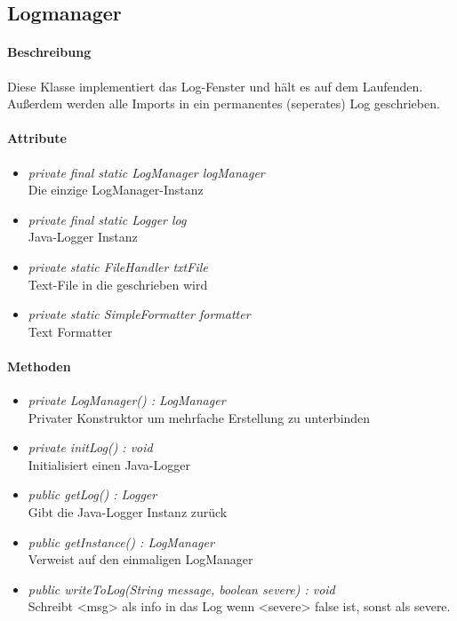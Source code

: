 \subsection{Logmanager}

\paragraph{Beschreibung}
Diese Klasse implementiert das Log-Fenster und hält es auf dem Laufenden.
Außerdem werden alle Imports in ein permanentes (seperates) Log geschrieben.


\paragraph{Attribute}

\begin{itemize}
	
\item \textit{private final static LogManager logManager}  
\\ Die einzige LogManager-Instanz 
\item \textit{private final static Logger log}
\\ Java-Logger Instanz
\item \textit{private static FileHandler txtFile}
\\ Text-File in die geschrieben wird
\item \textit{private static SimpleFormatter formatter}
\\ Text Formatter

\end{itemize}

\paragraph{Methoden}

\begin{itemize}
	
\item \textit{ private LogManager() : LogManager}  \\ Privater Konstruktor um mehrfache Erstellung zu unterbinden
\item \textit{ private initLog() : void} \\ Initialisiert einen Java-Logger
\item \textit{ public getLog() : Logger} \\ Gibt die Java-Logger Instanz zurück
\item \textit{ public getInstance() : LogManager}  \\ Verweist auf den einmaligen LogManager
\item \textit{ public writeToLog(String message, boolean severe) : void} \\ Schreibt <msg> als info in das Log wenn <severe> false ist,
sonst als severe.
	
\end{itemize}